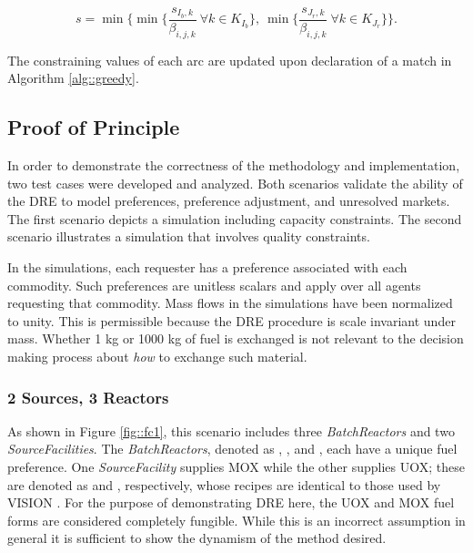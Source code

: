 \begin{equation}
  s = \min 
        \lbrace 
        \min \lbrace \frac{s_{I_b, k}}{\beta_{i, j, k}} 
        \: \forall k \in K_{I_b} \rbrace, 
        \: \min \lbrace \frac{s_{J_r, k}}{\beta_{i, j, k}} 
        \: \forall k \in K_{J_r} \rbrace
        \rbrace.
\end{equation}

The constraining values of each arc are updated upon declaration of a match in
Algorithm \ref{alg::greedy}.

\subsection{Proof of Principle}

In order to demonstrate the correctness of the methodology and implementation,
two test cases were developed and analyzed. Both scenarios validate the ability
of the DRE to model preferences, preference adjustment, and unresolved
markets. The first scenario depicts a simulation including capacity
constraints. The second scenario illustrates a simulation that involves quality
constraints.

In the simulations, each requester has a preference associated with each
commodity. Such preferences are unitless scalars and apply over all agents
requesting that commodity. Mass flows in the simulations have been normalized to
unity. This is permissible because the DRE procedure is scale invariant under
mass. Whether 1 kg or 1000 kg of fuel is exchanged is not relevant to the
decision making process about \emph{how} to exchange such material.

\subsubsection{2 Sources, 3 Reactors}

As shown in Figure \ref{fig::fc1}, this scenario includes
three \textit{BatchReactors} and
two \textit{SourceFacilities}. The \textit{BatchReactors}, denoted
as , , and , each have a unique fuel
preference. One \textit{SourceFacility} supplies MOX while the other supplies
UOX; these are denoted as \MOXSource{} and \UOXSource{}, respectively, whose
recipes are identical to those used by
VISION \cite{jacobson_verifiable_2010}. For the purpose of demonstrating DRE
here, the UOX and MOX fuel forms are considered completely fungible. While this
is an incorrect assumption in general it is sufficient to show the dynamism of
the method desired.

